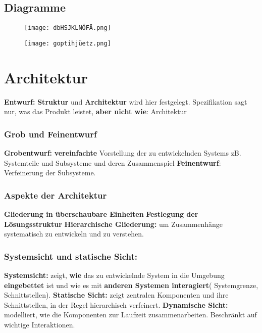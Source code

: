 \documentclass{book}
\begin{document}
    \section{Diagramme}
    \begin{figure}
        \centering
        \texttt{[image: dbHSJKLNÖFÄ.png]}
        \label{fig:enter-label}
    \end{figure}
    \begin{figure}
        \centering
        \texttt{[image: goptihjüetz.png]}
        \label{fig:enter-label}
    \end{figure}

    \chapter{Architektur}
    \textbf{Entwurf:} \textbf{Struktur} und\textbf{ Architektur }wird hier festgelegt. Spezifikation sagt nur, was das Produkt leistet, \textbf{aber nicht wie}: Architektur

    \subsection{Grob und Feinentwurf}
    \textbf{Grobentwurf: }\textbf{vereinfachte} Vorstellung der zu entwickelnden Systems zB. Systemteile und Subsysteme und deren Zusammenspiel
    \newline
    \textbf{Feinentwurf}: Verfeinerung der Subsysteme.

    \subsection{Aspekte der Architektur}
    \textbf{Gliederung in überschaubare Einheiten} \newline
    \textbf{Festlegung der Lösungsstruktur} \newline
    \textbf{Hierarchische Gliederung:} um Zusammenhänge systematisch zu entwickeln und zu verstehen.
    \subsection{Systemsicht und statische Sicht:}
    \textbf{Systemsicht:} zeigt, \textbf{wie} das zu entwickelnde System in die Umgebung \textbf{eingebettet} ist und wie es mit \textbf{anderen Systemen interagiert}( Systemgrenze, Schnittstellen). \newline
    \textbf{Statische Sicht:} zeigt zentralen Komponenten und ihre Schnittstellen, in der Regel hierarchisch verfeinert.
    \newline
    \textbf{Dynamische Sicht:} modelliert, wie die Komponenten zur Laufzeit zusammenarbeiten. Beschränkt auf wichtige Interaktionen.
\end{document}
